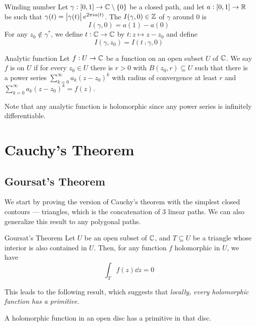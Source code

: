 \documentclass{styles/tufte}
\begin{document}
\begin{definition}{Winding number}{}
  Let $\gamma: [0, 1] \to \mathbb{C} \setminus \set{0}$ be a closed path, and let $a: [0, 1] \to \mathbb{R}$ be such that $\gamma(t) = \abs{\gamma(t)} e^{2\pi i a(t)}$. The  $I(\gamma, 0) \in \mathbb{Z}$ of $\gamma$ around $0$ is
  \[ I(\gamma, 0) = a(1) - a(0) \]
  For any $z_0 \notin \gamma^*$, we define $t: \mathbb{C} \to \mathbb{C}$ by $t: z \mapsto z - z_0$ and define
  \[ I(\gamma, z_0) = I(t \comp \gamma, 0) \]
\end{definition}

\begin{definition}{Analytic function}{}
  Let $f: U \to \mathbb{C}$ be a function on an open subset $U$ of $\mathbb{C}$. We say $f$ is  on $U$ if for every $z_0 \in U$ there is $r > 0$ with $B(z_0, r) \subseteq U$ such that there is a power series $\sum_{k=0}^\infty a_k (z-z_0)^k$ with radius of convergence at least $r$ and $\sum_{k=0}^\infty a_k (z-z_0)^k = f(z)$.
\end{definition}

Note that any analytic function is holomorphic since any power series is infinitely differentiable.



\section{Cauchy's Theorem}

\subsection{Goursat's Theorem}

  We start by proving the version of Cauchy's theorem with the simplest closed contours --- triangles, which is the concatenation of 3 linear paths. We can also generalize this result to any polygonal paths.

  \begin{theorem}{Goursat's Theorem}{}
    Let $U$ be an open subset of $\mathbb{C}$, and $T \subseteq U$ be a triangle whose interior is also contained in $U$. Then, for any function $f$ holomorphic in $U$, we have
    \[ \int_T f(z) \dd{z} = 0 \]
  \end{theorem}
  
  This leads to the following result, which suggests that \em{locally}, every holomorphic function has a primitive.
  \begin{theorem}{}{}
    A holomorphic function in an open disc has a primitive in that disc.
  \end{theorem}
  
\end{document}
